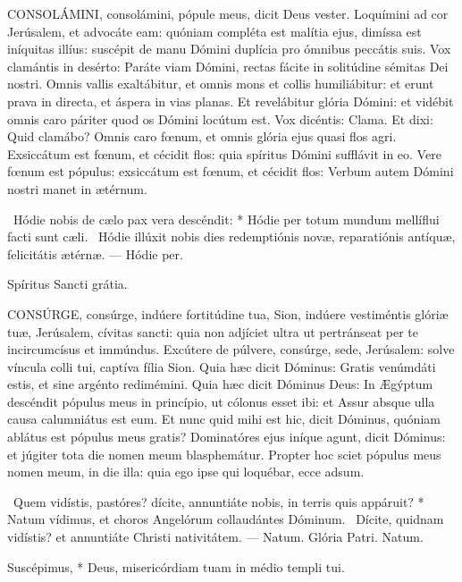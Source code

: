 \lettrine[lines=2]{C}{ONSOLÁMINI}, consolámini, pópule meus, dicit Deus vester. Loquímini ad cor Jerúsalem, et advocáte eam: quóniam compléta est malítia ejus, dimíssa est iníquitas illíus: suscépit de manu Dómini duplícia pro ómnibus peccátis suis. Vox clamántis in desérto: Paráte viam Dómini, rectas fácite in solitúdine sémitas Dei nostri. Omnis vallis exaltábitur, et omnis mons et collis humiliábitur: et erunt prava in directa, et áspera in vias planas. Et revelábitur glória Dómini: et vidébit omnis caro páriter quod os Dómini locútum est. Vox dicéntis: Clama. Et dixi: Quid clamábo? Omnis caro fœnum, et omnis glória ejus quasi flos agri. Exsiccátum est fœnum, et cécidit flos: quia spíritus Dómini sufflávit in eo. Vere fœnum est pópulus: exsiccátum est fœnum, et cécidit flos: Verbum autem Dómini nostri manet in ætérnum.

\R\ Hódie nobis de cælo pax vera descéndit: * Hódie per totum mundum mellíflui facti sunt cæli. \V\ Hódie illúxit nobis dies redemptiónis novæ, reparatiónis antíquæ, felicitátis ætérnæ. --- Hódie per.

 Spíritus Sancti grátia.


\lettrine[lines=2]{C}{ONSÚRGE}, consúrge, indúere fortitúdine tua, Sion, indúere vestiméntis glóriæ tuæ, Jerúsalem, cívitas sancti: quia non adjíciet ultra ut pertránseat per te incircumcísus et immúndus. Excútere de púlvere, consúrge, sede, Jerúsalem: solve víncula colli tui, captíva fília Sion. Quia hæc dicit Dóminus: Gratis venúmdáti estis, et sine argénto redimémini. Quia hæc dicit Dóminus Deus: In Ægýptum descéndit pópulus meus in princípio, ut cólonus esset ibi: et Assur absque ulla causa calumniátus est eum. Et nunc quid mihi est hic, dicit Dóminus, quóniam ablátus est pópulus meus gratis? Dominatóres ejus iníque agunt, dicit Dóminus: et júgiter tota die nomen meum blasphemátur. Propter hoc sciet pópulus meus nomen meum, in die illa: quia ego ipse qui loquébar, ecce adsum.

\R\ Quem vidístis, pastóres? dícite, annuntiáte nobis, in terris quis appáruit? * Natum vídimus, et choros Angelórum collaudántes Dóminum. \V\ Dícite, quidnam vidístis? et annuntiáte Christi nativitátem. --- Natum. Glória Patri. Natum.


 Suscépimus, * Deus, misericórdiam tuam in médio templi tui.


